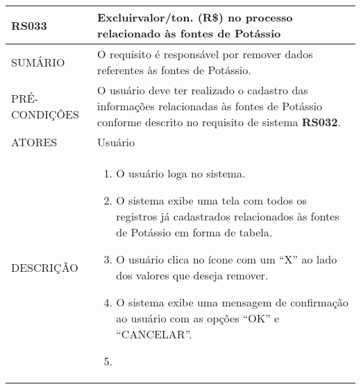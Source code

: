\begin{longtable}[c]{@{}|p{4cm}|p{9cm}|@{}}
\hline
\begin{minipage}[t]{0.47\columnwidth}
\textbf{RS033}
\end{minipage} & \begin{minipage}[t]{0.47\columnwidth}
Excluirvalor/ton. (R\$) no processo relacionado às fontes de Potássio
\end{minipage}
\\\hline
\begin{minipage}[t]{0.47\columnwidth}
SUMÁRIO
\end{minipage} & \begin{minipage}[t]{0.47\columnwidth}
O requisito é responsável por remover dados referentes às fontes de
Potássio.
\end{minipage}
\\\hline
\begin{minipage}[t]{0.47\columnwidth}
PRÉ-CONDIÇÕES
\end{minipage} & \begin{minipage}[t]{0.47\columnwidth}
O usuário deve ter realizado o cadastro das informações relacionadas às
fontes de Potássio conforme descrito no requisito de sistema \textbf{RS032}.
\end{minipage}
\\\hline
\begin{minipage}[t]{0.47\columnwidth}
ATORES
\end{minipage} & \begin{minipage}[t]{0.47\columnwidth}
Usuário
\end{minipage}
\\\hline
\begin{minipage}[t]{0.47\columnwidth}
DESCRIÇÃO
\end{minipage} & \begin{minipage}[t]{0.47\columnwidth}
\begin{enumerate}
\def\labelenumi{\arabic{enumi}.}
\itemsep1pt\parskip0pt\parsep0pt
\item
  O usuário loga no sistema.
\item
  O sistema exibe uma tela com todos os registros já cadastrados
  relacionados às fontes de Potássio em forma de tabela.
\item
  O usuário clica no ícone com um ``X'' ao lado dos valores que deseja
  remover.
\item
  O sistema exibe uma mensagem de confirmação ao usuário com as opções
  ``OK'' e ``CANCELAR''.
\item

\end{enumerate}
\end{minipage}
\end{longtable}
